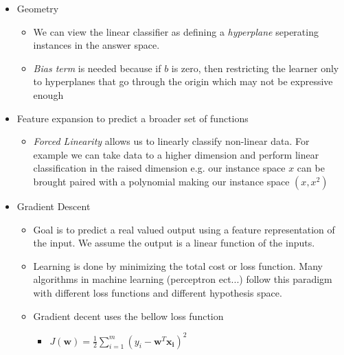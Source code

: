 \documentclass{article}
\begin{document}
\begin{itemize}
\begin{itemize}
	\end{itemize}
\item Geometry
	\begin{itemize}
	\item We can view the linear classifier as defining a {\em hyperplane} seperating instances in the answer space. 
	\item {\em Bias term} is needed because if $b$ is zero, then restricting the learner only to hyperplanes that go through the origin which may not be expressive enough
	\end{itemize}
\item Feature expansion to predict a broader set of functions
	\begin{itemize}
	\item {\em Forced Linearity} allows us to linearly classify non-linear data. For example we can take data to a higher dimension and perform linear classification in the raised dimension e.g. our instance space $x$ can be brought paired with a polynomial making our instance space $(x, x^2)$
	\end{itemize}
	\item Gradient Descent 
	\begin{itemize}
	\item Goal is to predict a real valued output using a feature representation of the input. We assume the output is a linear function of the inputs. 
	\item Learning is done by minimizing the total cost or loss function. Many algorithms in machine learning (perceptron ect...) follow this paradigm with different loss functions and different hypothesis space. 
	\item Gradient decent uses the bellow loss function
	\begin{itemize}
	\item $J(\mathbf{w}) = \frac{1}{2}\sum_{i=1}^{m}(y_i - \mathbf{w}^T\mathbf{x_i})^2$
	\end{itemize}
	\end{itemize}
\end{itemize}
\end{document}
